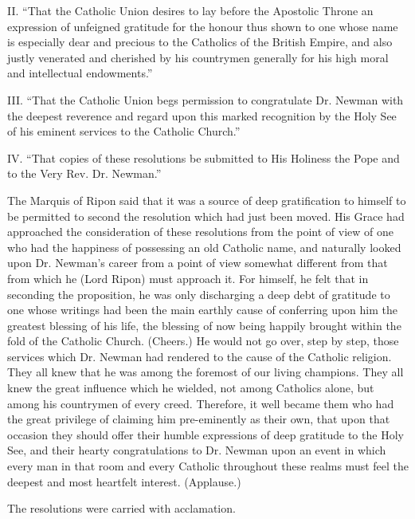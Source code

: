 II. ``That the Catholic Union desires to lay before the
Apostolic Throne an expression of unfeigned gratitude for the honour
thus shown to one whose name is especially dear and precious to the
Catholics of the British Empire, and also justly venerated and
cherished by his countrymen generally for
his high moral and intellectual endowments.''

III. ``That the Catholic Union begs permission to congratulate
Dr. Newman with the deepest reverence and regard upon this marked
recognition by the Holy See of his eminent services to the Catholic
Church.''

IV. ``That copies of these resolutions be submitted to His
Holiness the Pope and to the Very Rev. Dr. Newman.''

The Marquis of Ripon said that it was a source of deep
gratification to himself to be permitted to second the resolution
which had just been moved. His Grace had approached the consideration
of these resolutions from the point of view of one who had the
happiness of possessing an old Catholic name, and naturally looked
upon Dr. Newman's career from a point of view somewhat different from
that from which he (Lord Ripon) must approach it. For himself, he felt
that in seconding the proposition, he was only discharging a deep debt
of gratitude to one whose writings had been the main earthly cause of
conferring upon him the greatest blessing of his life, the blessing of
now being happily brought within the fold of the Catholic Church.
(Cheers.) He would not go over, step by step, those services which Dr.
Newman had rendered to the cause of the Catholic religion. They all
knew that he was among the foremost of our living champions. They all
knew the great influence which he wielded, not among Catholics alone,
but among his countrymen of every creed. Therefore, it well became
them who had the great privilege of claiming him pre-eminently as
their own, that upon that occasion they should offer their humble
expressions of deep gratitude to the Holy See, and their hearty
congratulations to Dr. Newman upon an event in which every man in that room and every Catholic throughout these
realms must feel the deepest and most heartfelt interest. (Applause.)

The resolutions were carried with acclamation.



